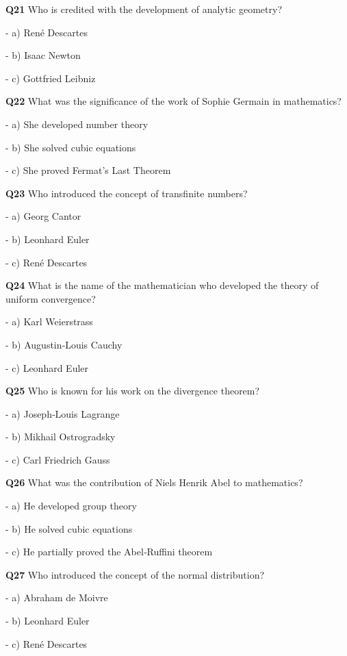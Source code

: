 \textbf{Q21} Who is credited with the development of analytic geometry?\par
\quad - a) René Descartes\par
\quad - b) Isaac Newton\par
\quad - c) Gottfried Leibniz\par

\textbf{Q22} What was the significance of the work of Sophie Germain in mathematics?\par
\quad - a) She developed number theory\par
\quad - b) She solved cubic equations\par
\quad - c) She proved Fermat's Last Theorem\par

\textbf{Q23} Who introduced the concept of transfinite numbers?\par
\quad - a) Georg Cantor\par
\quad - b) Leonhard Euler\par
\quad - c) René Descartes\par

\textbf{Q24} What is the name of the mathematician who developed the theory of uniform convergence?\par
\quad - a) Karl Weierstrass\par
\quad - b) Augustin‑Louis Cauchy\par
\quad - c) Leonhard Euler\par

\textbf{Q25} Who is known for his work on the divergence theorem?\par
\quad - a) Joseph‑Louis Lagrange\par
\quad - b) Mikhail Ostrogradsky\par
\quad - c) Carl Friedrich Gauss\par

\textbf{Q26} What was the contribution of Niels Henrik Abel to mathematics?\par
\quad - a) He developed group theory\par
\quad - b) He solved cubic equations\par
\quad - c) He partially proved the Abel‑Ruffini theorem\par

\textbf{Q27} Who introduced the concept of the normal distribution?\par
\quad - a) Abraham de Moivre\par
\quad - b) Leonhard Euler\par
\quad - c) René Descartes\par

